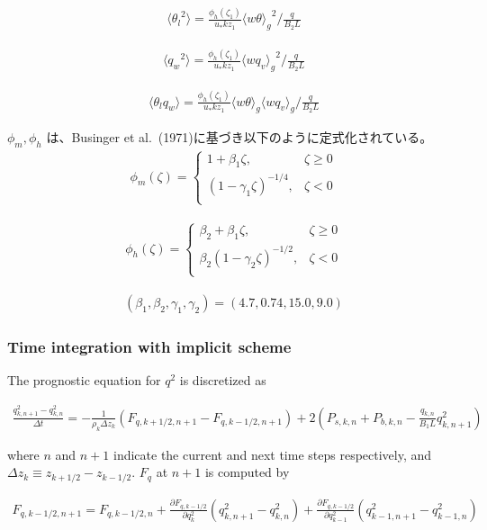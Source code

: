 \begin{eqnarray}\langle {\theta_l}^2\rangle=\frac{\phi_h\left(\zeta_1\right)}{u_*kz_1}{\langle w\theta \rangle_g}^2 \bigg/ \frac{q}{B_2L} \end{eqnarray}

\begin{eqnarray}\langle {q_w}^2\rangle=\frac{\phi_h\left(\zeta_1\right)}{u_*kz_1}{\langle wq_v\rangle_g}^2 \bigg/ \frac{q}{B_2L} \end{eqnarray}

\begin{eqnarray}\langle \theta_lq_w\rangle=\frac{\phi_h\left(\zeta_1\right)}{u_*kz_1}\langle w\theta \rangle_g\langle wq_v \rangle_g \bigg/ \frac{q}{B_2L} \end{eqnarray}

\(\phi_m,\phi_h\) は、Businger et
al.~(1971)に基づき以下のように定式化されている。 \begin{eqnarray}
\phi_m(\zeta)=\left\{
    \begin{array}{lr}
      1+\beta_1\zeta, &\zeta\ge 0\\
      \left(1-\gamma_1\zeta\right)^{-1/4}, &\zeta< 0\\
    \end{array}
  \right.
\end{eqnarray}

\begin{eqnarray}
\phi_h(\zeta)=\left\{
    \begin{array}{lr}
      \beta_2+\beta_1\zeta, &\zeta\ge 0\\
      \beta_2\left(1-\gamma_2\zeta\right)^{-1/2}, &\zeta< 0\\
    \end{array}
  \right.
\end{eqnarray}

\begin{eqnarray}(\beta_1,\beta_2,\gamma_1,\gamma_2)=(4.7,0.74,15.0,9.0)\end{eqnarray}

\hypertarget{time-integration-with-implicit-scheme}{%
\subsubsection{Time integration with implicit
scheme}\label{time-integration-with-implicit-scheme}}

The prognostic equation for \(q^2\) is discretized as

\begin{eqnarray} \frac{q^2_{k,n+1}-q^2_{k,n}}{\Delta t} = -\frac{1}{\rho_k\Delta z_k}\left(F_{q,k+1/2,n+1}-F_{q,k-1/2,n+1}\right) +2\left( P_{s,k,n} + P_{b,k,n} - \frac{q_{k,n}}{B_1L}q^2_{k,n+1}\right) \end{eqnarray}

where \(n\) and \(n+1\) indicate the current and next time steps
respectively, and \(\Delta z_k \equiv z_{k+1/2}-z_{k-1/2}\). \(F_q\) at
\(n+1\) is computed by

\begin{eqnarray} F_{q,k-1/2,n+1} = F_{q,k-1/2,n} + \frac{\partial F_{q,k-1/2}}{\partial q^2_k}(q^2_{k,n+1}-q^2_{k,n}) +  \frac{\partial F_{q,k-1/2}}{\partial q^2_{k-1}}(q^2_{k-1,n+1}-q^2_{k-1,n})\end{eqnarray}
